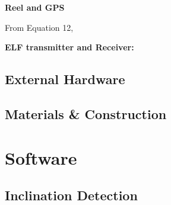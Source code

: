 \documentclass[11pt]{article}		%
\begin{document}
	    \textbf{Reel and GPS}

        From Equation 12,





        \textbf{ELF transmitter and Receiver:}
        

		
		
		
		
		\subsection{External Hardware}
		
		
	
		\subsection{Materials \& Construction}
		
	
	\section{Software}
		
		\subsection{Inclination Detection}
		
\end{document}
